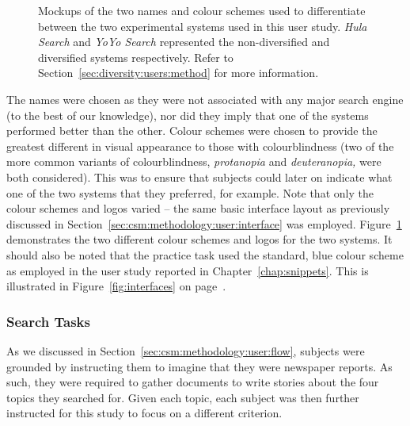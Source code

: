 \begin{figure}[t!]
    \centering
    \caption[Diversity user study interface mockups]{Mockups of the two names and colour schemes used to differentiate between the two experimental systems used in this user study. \emph{Hula Search} and \emph{YoYo Search} represented the non-diversified and diversified systems respectively. Refer to Section~\ref{sec:diversity:users:method} for more information.}
    \label{fig:interface_headers}
\end{figure}

The names were chosen as they were not associated with any major search engine (to the best of our knowledge), nor did they imply that one of the systems performed better than the other. Colour schemes were chosen to provide the greatest different in visual appearance to those with colourblindness (two of the more common variants of colourblindness, \emph{protanopia} and \emph{deuteranopia,} were both considered). This was to ensure that subjects could later on indicate what one of the two systems that they preferred, for example. Note that only the colour schemes and logos varied -- the same basic interface layout as previously discussed in Section~\ref{sec:csm:methodology:user:interface} was employed. Figure~\ref{fig:interface_headers} demonstrates the two different colour schemes and logos for the two systems. It should also be noted that the practice task used the standard, blue colour scheme as employed in the user study reported in Chapter~\ref{chap:snippets}. This is illustrated in Figure~\ref{fig:interfaces} on page~\pageref{fig:interfaces}.

\subsubsection{Search Tasks}
As we discussed in Section~\ref{sec:csm:methodology:user:flow}, subjects were grounded by instructing them to imagine that they were newspaper reports. As such, they were required to gather documents to write stories about the four topics they searched for. Given each topic, each subject was then further instructed for this study to focus on a different criterion.

